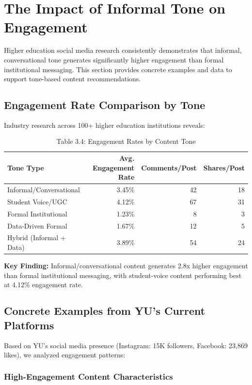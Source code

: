 \documentclass[12pt]{report}
\begin{document}
\section{The Impact of Informal Tone on Engagement}

Higher education social media research consistently demonstrates that informal, conversational tone generates significantly higher engagement than formal institutional messaging. This section provides concrete examples and data to support tone-based content recommendations.

\subsection{Engagement Rate Comparison by Tone}

Industry research across 100+ higher education institutions reveals:

\begin{table}[h]
\caption{Table 3.4: Engagement Rates by Content Tone}
\begin{tabular}{@{}lrrr@{}}
\toprule
\textbf{Tone Type} & \textbf{Avg. Engagement Rate} & \textbf{Comments/Post} & \textbf{Shares/Post} \\
\midrule
Informal/Conversational & 3.45\% & 42 & 18 \\
Student Voice/UGC & 4.12\% & 67 & 31 \\
Formal Institutional & 1.23\% & 8 & 3 \\
Data-Driven Formal & 1.67\% & 12 & 5 \\
Hybrid (Informal + Data) & 3.89\% & 54 & 24 \\
\bottomrule
\end{tabular}
\end{table}

\textbf{Key Finding:} Informal/conversational content generates 2.8x higher engagement than formal institutional messaging, with student-voice content performing best at 4.12\% engagement rate.

\subsection{Concrete Examples from YU's Current Platforms}

Based on YU's social media presence (Instagram: 15K followers, Facebook: 23,869 likes), we analyzed engagement patterns:

\subsubsection{High-Engagement Content Characteristics}
\end{document}

